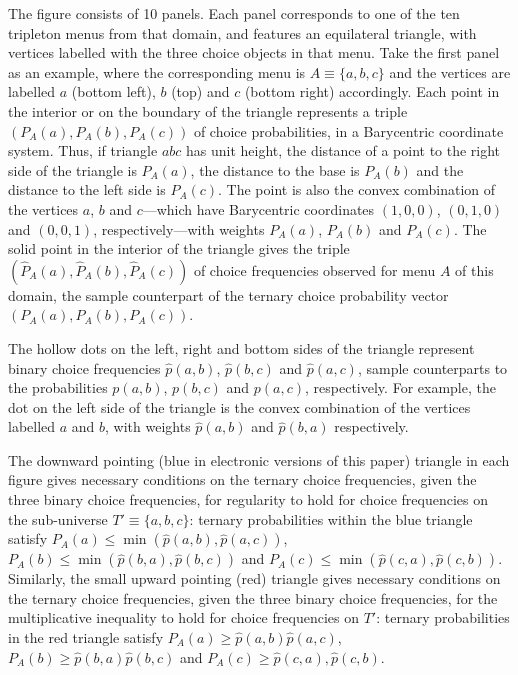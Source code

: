 \documentclass[11pt,letter]{article}
\newcommand{\menu}{menu}
\newcommand{\menus}{menus}
\begin{document}
The figure consists of 10 panels.
Each panel corresponds to one of the ten tripleton \menus{} from that domain, and features an equilateral triangle, with vertices labelled with the three choice objects in that \menu{}.
Take the first panel as an example, where the corresponding \menu{} is $A \equiv \{a,b,c\}$ and the vertices are labelled $a$ (bottom left), $b$ (top) and $c$ (bottom right) accordingly.
Each point in the interior or on the boundary of the triangle represents a triple $(P_A(a),P_A(b),P_A(c))$ of choice probabilities, in a Barycentric coordinate system.
Thus, if triangle $abc$ has unit height, the distance of a point to the right side of the triangle is $P_A(a)$, the distance to the base is $P_A(b)$ and the distance to the left side is $P_A(c)$.
The point is also the convex combination of the vertices $a$, $b$ and $c$---which have Barycentric coordinates $(1,0,0)$, $(0,1,0)$ and $(0,0,1)$, respectively---with weights $P_A(a)$, $P_A(b)$ and $P_A(c)$.
The solid point in the interior of the triangle gives the triple $(\hat P_A(a), \hat P_A(b), \hat P_A(c))$ of choice frequencies observed for menu $A$ of this domain, the sample counterpart of the ternary choice probability vector $(P_A(a),P_A(b),P_A(c))$.

The hollow dots on the left, right and bottom sides of the triangle represent binary choice frequencies $\hat p(a,b)$, $\hat p(b,c)$ and $\hat p(a,c)$, sample counterparts to the probabilities $p(a,b)$, $p(b,c)$ and $p(a,c)$, respectively.
For example, the dot on the left side of the triangle is the convex combination of the vertices labelled $a$ and $b$, with weights $\hat p(a,b)$ and $\hat p(b,a)$ respectively.

The downward pointing (blue in electronic versions of this paper) triangle in each figure gives necessary conditions on the ternary choice frequencies, given the three binary choice frequencies, for regularity to hold for choice frequencies on the sub-universe $T' \equiv \{a,b,c\}$: ternary probabilities within the blue triangle satisfy $P_A(a) \leq \min(\hat p(a,b), \hat p(a,c))$, $P_A(b) \leq \min(\hat p(b,a), \hat p(b,c))$ and $P_A(c) \leq \min(\hat p(c,a), \hat p(c,b))$.
Similarly, the small upward pointing (red) triangle gives necessary conditions on the ternary choice frequencies, given the three binary choice frequencies, for the multiplicative inequality to hold for choice frequencies on $T'$: ternary probabilities in the red triangle satisfy $P_A(a) \geq \hat p(a,b) \hat p(a,c)$, $P_A(b) \geq \hat p(b,a) \hat p(b,c)$ and $P_A(c) \geq \hat p(c,a), \hat p(c,b)$.
\end{document}
